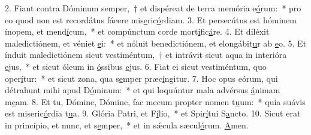 2. Fiant contra Dóminum semper,~† et dispéreat de terra memória e\uline{ó}rum:~* pro eo quod non est recordátus fácere mis\uline{e}ric\uline{ó}rdiam.
3. Et persecútus est hóminem ínopem, et mend\uline{í}cum,~* et compúnctum corde mort\uline{i}fic\uline{á}re.
4. Et diléxit maledictiónem, et véniet \uline{e}i:~* et nóluit benedictiónem, et elongábit\uline{u}r ab \uline{e}o.
5. Et índuit maledictiónem sicut vestiméntum,~† et intrávit sicut aqua in interióra \uline{e}jus,~* et sicut óleum in \uline{ó}ssibus \uline{e}jus.
6. Fiat ei sicut vestiméntum, quo oper\uline{í}tur:~* et sicut zona, qua s\uline{e}mper præc\uline{í}ngitur.
7. Hoc opus eórum, qui détrahunt mihi apud D\uline{ó}minum:~* et qui loquúntur mala advérsus \uline{á}nimam m\uline{e}am.
8. Et tu, Dómine, Dómine, fac mecum propter nomen t\uline{u}um:~* quia suávis est miseric\uline{ó}rdia t\uline{u}a.
9. Glória Patri, et F\uline{í}lio,~* et Spir\uline{í}tui S\uline{a}ncto.
10. Sicut erat in princípio, et nunc, et s\uline{e}mper,~* et in sǽcula sæcul\uline{ó}rum. \uline{A}men.
